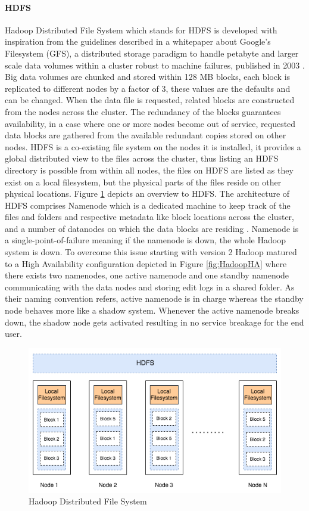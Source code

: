 \documentclass[review]{elsarticle}
\begin{document}
\paragraph{HDFS}Hadoop Distributed File System which stands for HDFS is developed with inspiration from the guidelines described in a whitepaper about Google's Filesystem (GFS), a distributed storage paradigm to handle petabyte and larger scale data volumes within a cluster robust to machine failures, published in 2003 \cite{ghemawat_google_2003}. Big data volumes are chunked and stored within 128 MB blocks, each block is replicated to different nodes by a factor of 3, these values are the defaults and can be changed. When the data file is requested, related blocks are constructed from the nodes across the cluster. The redundancy of the blocks guarantees availability, in a case where one or more nodes become out of service, requested data blocks are gathered from the available redundant copies stored on other nodes. HDFS is a co-existing file system on the nodes it is installed, it provides a global distributed view to the files across the cluster, thus listing an HDFS directory is possible from within all nodes, the files on HDFS are listed as they exist on a local filesystem, but the physical parts of the files reside on other physical locations. Figure \ref{fig:HDFSoverview} depicts an overview to HDFS. The architecture of HDFS comprises Namenode which is a dedicated machine to keep track of the files and folders and respective metadata like block locations across the cluster, and a number of datanodes on which the data blocks are residing \cite{white_hadoop_2015}. Namenode is a single-point-of-failure meaning if the namenode is down, the whole Hadoop system is down. To overcome this issue starting with version 2 Hadoop matured to a High Availability configuration depicted in Figure \ref{fig:HadoopHA} where there exists two namenodes, one active namenode and one standby namenode communicating with the data nodes and storing edit logs in a shared folder. As their naming convention refers, active namenode is in charge whereas the standby node behaves more like a shadow system. Whenever the active namenode breaks down, the shadow node gets activated resulting in no service breakage for the end user.


\begin{figure}[h!]
	\includegraphics[width=\textwidth]{HDFSoverview}
	\caption{Hadoop Distributed File System}
	\label{fig:HDFSoverview}
	\centering
\end{figure}
\end{document}
